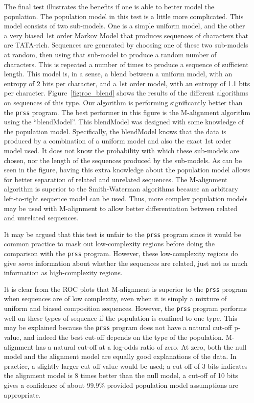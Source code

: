 \documentclass[letterpaper,11pt,oneside]{article}
\begin{document}
The final test illustrates the benefits if one is able to better model the
population.  The population model in this test is a little more complicated.
This model consists of two sub-models.  One is a simple uniform model, and the
other a very biased 1st order Markov Model that produces sequences of
characters that are TATA-rich.  Sequences are generated by
choosing one of these two sub-models at random, then using that sub-model to
produce a random number of characters.  This is repeated a number of times to
produce a sequence of sufficient length.  This model is, in a sense, a blend
between a uniform model, with an entropy of 2 bits per character, and a 1st
order model, with an entropy of 1.1 bits per character.
Figure~\ref{fig:roc_blend} shows the results of the different algorithms on
sequences of this type.  Our algorithm is performing significantly better than
the \verb!prss! program.  The best performer in this figure is the M-alignment
algorithm using the ``blendModel''.  This blendModel was designed with some
knowledge of the population model.  Specifically, the blendModel knows that
the data is produced by a combination of a uniform model and also the exact
1st order model used.  It does not know the probability with which these
sub-models are chosen, nor the length of the sequences produced by the
sub-models.  As can be seen in the figure, having this extra knowledge about
the population model allows for better separation of related and unrelated
sequences.  The M-alignment algorithm is superior to the Smith-Waterman
algorithms because an arbitrary left-to-right sequence model can be used.
Thus, more complex population models may be used with M-alignment to allow
better differentiation between related and unrelated sequences.


It may be argued that this test is unfair to the \verb!prss! program since it
would be common practice to mask out low-complexity regions before doing the
comparison with the \verb!prss! program.  However, these low-complexity
regions do give \emph{some} information about whether the sequences are
related, just not as much information as high-complexity regions.



It is clear from the ROC plots that M-alignment is superior to
the \verb!prss! program when sequences are of low complexity, even when it is
simply a mixture of uniform and biased composition sequences.  However, the
\verb!prss! program performs well on these types of sequence if the population
is confined to one type.  This may be explained because the \verb!prss!
program does not have a natural cut-off p-value, and indeed the best cut-off
depends on the type of the population.  M-alignment has a natural cut-off at a
log-odds ratio of zero.  At zero, both the null model and the alignment model
are equally good explanations of the data.  In practice, a slightly larger
cut-off value would be used; a cut-off of 3 bits indicates the alignment model
is 8 times better than the null model, a cut-off of 10 bits gives a confidence
of about 99.9\% provided population model assumptions are appropriate.
\end{document}
